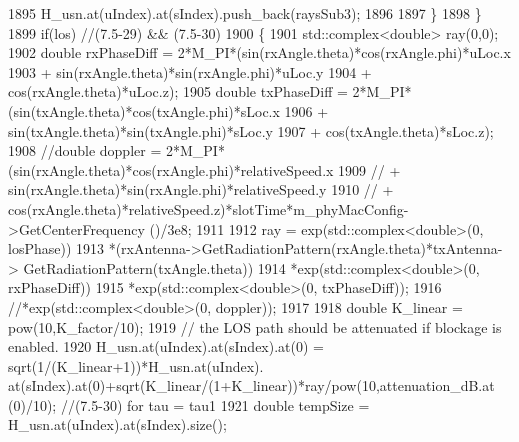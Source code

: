 \begin{DoxyCode}
1895                                         H\_usn.at(uIndex).at(sIndex).push\_back(raysSub3);
1896 
1897                                 \}
1898                         \}
1899                         \textcolor{keywordflow}{if}(los) \textcolor{comment}{//(7.5-29) && (7.5-30)}
1900                         \{
1901                                 std::complex<double> ray(0,0);
1902                                 \textcolor{keywordtype}{double} rxPhaseDiff = 2*M\_PI*(sin(rxAngle.theta)*cos(rxAngle.phi)*uLoc.x
1903                                                 + sin(rxAngle.theta)*sin(rxAngle.phi)*uLoc.y
1904                                                 + cos(rxAngle.theta)*uLoc.z);
1905                                 \textcolor{keywordtype}{double} txPhaseDiff = 2*M\_PI*(sin(txAngle.theta)*cos(txAngle.phi)*sLoc.x
1906                                                 + sin(txAngle.theta)*sin(txAngle.phi)*sLoc.y
1907                                                 + cos(txAngle.theta)*sLoc.z);
1908                                 \textcolor{comment}{//double doppler =
       2*M\_PI*(sin(rxAngle.theta)*cos(rxAngle.phi)*relativeSpeed.x}
1909                                 \textcolor{comment}{//              + sin(rxAngle.theta)*sin(rxAngle.phi)*relativeSpeed.y}
1910                                 \textcolor{comment}{//              +
       cos(rxAngle.theta)*relativeSpeed.z)*slotTime*m\_phyMacConfig->GetCenterFrequency ()/3e8;}
1911 
1912                                 ray = exp(std::complex<double>(0, losPhase))
1913                                                 *(rxAntenna->GetRadiationPattern(rxAngle.theta)*txAntenna->
      GetRadiationPattern(txAngle.theta))
1914                                                 *exp(std::complex<double>(0, rxPhaseDiff))
1915                                                 *exp(std::complex<double>(0, txPhaseDiff));
1916                                                 \textcolor{comment}{//*exp(std::complex<double>(0, doppler));}
1917 
1918                                 \textcolor{keywordtype}{double} K\_linear = pow(10,K\_factor/10);
1919                                 \textcolor{comment}{// the LOS path should be attenuated if blockage is enabled.}
1920                                 H\_usn.at(uIndex).at(sIndex).at(0) = sqrt(1/(K\_linear+1))*H\_usn.at(uIndex).
      at(sIndex).at(0)+sqrt(K\_linear/(1+K\_linear))*ray/pow(10,attenuation\_dB.at (0)/10);  \textcolor{comment}{//(7.5-30) for tau = tau1}
1921                                 \textcolor{keywordtype}{double} tempSize = H\_usn.at(uIndex).at(sIndex).size();

\end{DoxyCode}
